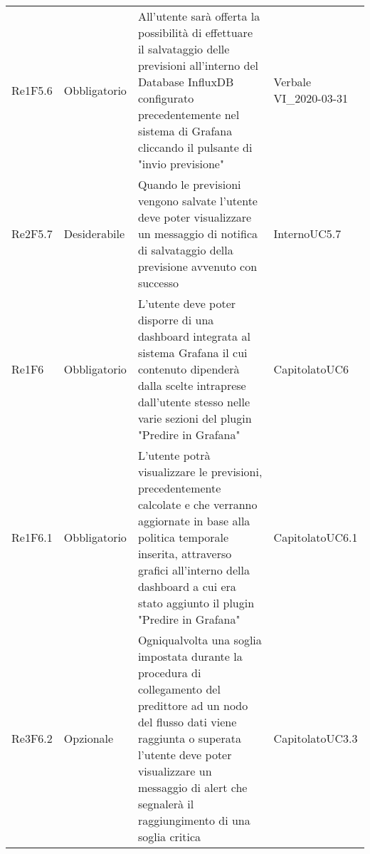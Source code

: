 \begin{longtable}{C{3cm} C{3cm} L{6.5cm} C{2.5cm}}
Re1F5.6 & Obbligatorio & All'utente sarà offerta la possibilità di effettuare il salvataggio delle previsioni all'interno del Database InfluxDB configurato precedentemente nel sistema di Grafana cliccando il pulsante di "invio previsione" &  Verbale VI\_2020-03-31\\
Re2F5.7 & Desiderabile & Quando le previsioni vengono salvate l'utente deve poter visualizzare un messaggio di notifica di salvataggio della previsione avvenuto con successo &  Interno\newline UC5.7\\
Re1F6 & Obbligatorio & L'utente deve poter disporre di una dashboard integrata al sistema Grafana il cui contenuto dipenderà dalla scelte intraprese dall'utente stesso nelle varie sezioni del plugin "Predire in Grafana" & Capitolato\newline UC6\\
Re1F6.1 & Obbligatorio & L'utente potrà visualizzare le previsioni, precedentemente calcolate e che verranno aggiornate in base alla politica temporale inserita, attraverso grafici all'interno della dashboard a cui era stato aggiunto il plugin "Predire in Grafana" &  Capitolato\newline UC6.1\\
Re3F6.2 & Opzionale & Ogniqualvolta una soglia impostata durante la procedura di collegamento del predittore ad un nodo del flusso dati viene raggiunta o superata l'utente deve poter visualizzare un messaggio di alert che segnalerà il raggiungimento di una soglia critica &  Capitolato\newline UC3.3\\


\end{longtable}
